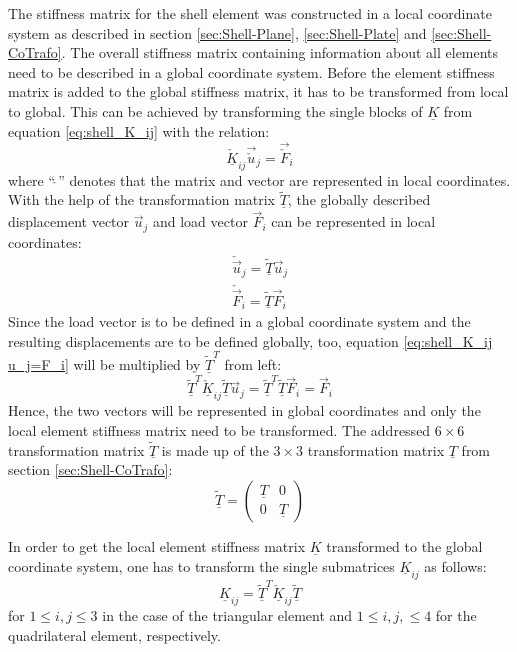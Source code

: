  The stiffness matrix for the shell element was constructed in a local coordinate system as described in section \ref{sec:Shell-Plane}, \ref{sec:Shell-Plate} and \ref{sec:Shell-CoTrafo}. The overall stiffness matrix containing information about all elements need to be described in a global coordinate system. Before the element stiffness matrix is added to the global stiffness matrix, it has to be transformed from local to global. This can be achieved by transforming the single blocks of $\underline{K}$ from equation \ref{eq:shell_K_ij} with the relation:
 \begin{equation}\label{eq:shell_K_ij u_j=F_i}
 \underline{\check{K}}_{ij} \vec{\check{u}}_j = \vec{\check{F}}_i
 \end{equation}
 where ``\;$\check{\ }$\;'' denotes that the matrix and vector are represented in local coordinates. With the help of the transformation matrix $\underline{\tilde{T}}$, the globally described displacement vector $\vec{u}_j$ and load vector $\vec{F}_i$ can be represented in local coordinates:
 \begin{align}
 \check{\vec{u}}_j = \underline{\tilde{T}} \vec{u}_j\\
 \check{\vec{F}}_i = \underline{\tilde{T}} \vec{F}_i
 \end{align}
 Since the load vector is to be defined in a global coordinate system and the resulting displacements are to be defined globally, too, equation \ref{eq:shell_K_ij u_j=F_i} will be multiplied by $\underline{\tilde{T}}^T$ from left:
 \begin{equation}
 \underline{\tilde{T}}^T \underline{\check{K}}_{ij} \underline{\tilde{T}} \vec{u}_j = \underline{\tilde{T}}^T \underline{\tilde{T}} \vec{F}_i = \vec{F}_i
 \end{equation}
 Hence, the two vectors will be represented in global coordinates and only the local element stiffness matrix need to be transformed. The addressed $6\!\times\!6$ transformation matrix $\underline{\tilde{T}}$ is made up of the $3\!\times\!3$ transformation matrix $\underline{T}$ from section \ref{sec:Shell-CoTrafo}:
 \begin{equation}\label{eq:trafoTtilde}
 \underline{\tilde{T}} = \begin{pmatrix}
 \underline{T} & 0\\
 0 & \underline{T}
 \end{pmatrix}
 \end{equation}
 
 In order to get the local element stiffness matrix $\underline{K}$ transformed to the global coordinate system, one has to transform the single submatrices $\underline{K}_{ij}$ as follows:
 \begin{equation}\label{eq:Kij=Tt Kij T}
 \underline{K}_{ij} = \underline{\tilde{T}}^T \underline{\check{K}}_{ij} \underline{\tilde{T}}
 \end{equation}
 for $1 \leq i,j \leq 3$ in the case of the triangular element and $1 \leq i,j, \leq 4$ for the quadrilateral element, respectively.
 \newpage